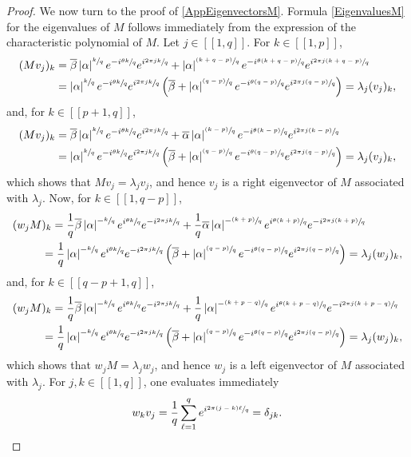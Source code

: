 \documentclass[JEP,XML,SOM,Unicode]{cedram}
\newcommand{\psfrac}[2]{\sfrac{(#1)}{#2}}
\newcommand{\llbracket}{[\![}
\newcommand{\rrbracket}{]\!]}
\theoremstyle{plain}
\theoremstyle{definition}
\newcommand{\abs}[1]{\left\lvert #1\right \rvert}
\begin{document}
\begin{proof}
We now turn to the proof of \eqref{AppEigenvectorsM}. Formula \eqref{EigenvaluesM} for the eigenvalues of $M$ follows immediately from the expression of the characteristic polynomial of $M$. Let $j \in \llbracket 1, q\rrbracket$. For $k \in \llbracket 1, p\rrbracket$,
\begin{align*}
(M v_j)_k & = \overline\beta \abs{\alpha}^{\sfrac{k}{q}} e^{-i \sfrac{\theta k}{q}} e^{i \sfrac{2\pi j k}{q}} + \abs{\alpha}^{\psfrac{k+q-p}{q}} e^{-i \sfrac{\theta (k+q-p)}{q}} e^{i \sfrac{2\pi j (k+q-p)}{q}} \\
& = \abs{\alpha}^{\sfrac{k}{q}} e^{-i \sfrac{\theta k}{q}} e^{i \sfrac{2\pi j k}{q}} \left(\overline\beta + \abs{\alpha}^{\psfrac{q-p}{q}} e^{-i \sfrac{\theta (q-p)}{q}} e^{i \sfrac{2\pi j (q-p)}{q}}\right) = \lambda_j (v_j)_k,
\end{align*}
and, for $k \in \llbracket p+1, q\rrbracket$,
\begin{align*}
(M v_j)_k & = \overline\beta \abs{\alpha}^{\sfrac{k}{q}} e^{-i \sfrac{\theta k}{q}} e^{i \sfrac{2\pi j k}{q}} + \overline\alpha \abs{\alpha}^{\psfrac{k-p}{q}} e^{-i \sfrac{\theta (k-p)}{q}} e^{i \sfrac{2\pi j (k-p)}{q}} \\
& = \abs{\alpha}^{\sfrac{k}{q}} e^{-i \sfrac{\theta k}{q}} e^{i \sfrac{2\pi j k}{q}} \left(\overline\beta + \abs{\alpha}^{\psfrac{q-p}{q}} e^{-i \sfrac{\theta (q-p)}{q}} e^{i \sfrac{2\pi j (q-p)}{q}}\right) = \lambda_j (v_j)_k,
\end{align*}
which shows that $M v_j = \lambda_j v_j$, and hence $v_j$ is a right eigenvector of $M$ associated with $\lambda_j$. Now, for $k \in \llbracket 1, q-p\rrbracket$,
\begin{align*}
(w_j M&)_k = \frac{1}{q} \overline\beta \abs{\alpha}^{-\sfrac{k}{q}} e^{i \sfrac{\theta k}{q}} e^{-i \sfrac{2\pi j k}{q}} + \frac{1}{q} \overline\alpha \abs{\alpha}^{-\psfrac{k+p}{q}} e^{i \sfrac{\theta (k+p)}{q}} e^{-i \sfrac{2\pi j (k+p)}{q}} \\
& = \frac{1}{q} \abs{\alpha}^{-\sfrac{k}{q}} e^{i \sfrac{\theta k}{q}} e^{-i \sfrac{2\pi j k}{q}} \left(\overline\beta + \abs{\alpha}^{\psfrac{q-p}{q}} e^{-i \sfrac{\theta (q-p)}{q}} e^{i \sfrac{2\pi j (q-p)}{q}}\right) = \lambda_j (w_j)_k,
\end{align*}
and, for $k \in \llbracket q-p+1, q\rrbracket$,
\begin{align*}
(w_j M&)_k = \frac{1}{q} \overline\beta \abs{\alpha}^{-\sfrac{k}{q}} e^{i \sfrac{\theta k}{q}} e^{-i \sfrac{2\pi j k}{q}} + \frac{1}{q} \abs{\alpha}^{-\psfrac{k+p-q}{q}} e^{i \sfrac{\theta (k+p-q)}{q}} e^{-i \sfrac{2\pi j (k+p-q)}{q}} \\
& = \frac{1}{q} \abs{\alpha}^{-\sfrac{k}{q}} e^{i \sfrac{\theta k}{q}} e^{-i \sfrac{2\pi j k}{q}} \left(\overline\beta + \abs{\alpha}^{\psfrac{q-p}{q}} e^{-i \sfrac{\theta (q-p)}{q}} e^{i \sfrac{2\pi j (q-p)}{q}}\right) = \lambda_j (w_j)_k,
\end{align*}
which shows that $w_j M = \lambda_j w_j$, and hence $w_j$ is a left eigenvector of $M$ associated with $\lambda_j$. For $j, k \in \llbracket 1, q\rrbracket$, one evaluates immediately
\[
w_k v_j = \frac{1}{q} \sum_{\ell=1}^q e^{i \sfrac{2\pi (j - k) \ell}{q}} = \delta_{jk}.
\]


\end{proof}
\end{document}
